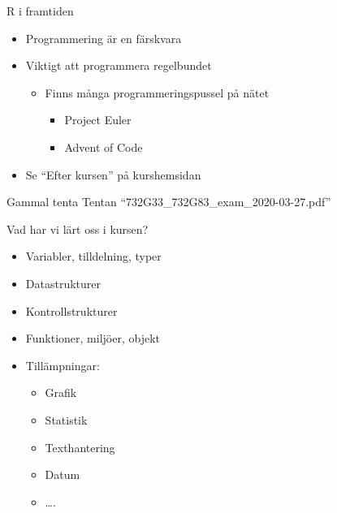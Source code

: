 \documentclass[
  11pt,
  ignorenonframetext,
  handout]{beamer}
\providecommand{\tightlist}{%
  \setlength{\itemsep}{0pt}\setlength{\parskip}{0pt}}
\begin{document}
\begin{frame}{R i framtiden}
\protect\hypertarget{r-i-framtiden}{}
\begin{itemize}
\tightlist
\item
  Programmering är en färskvara
\item
  Viktigt att programmera regelbundet

  \begin{itemize}
  \tightlist
  \item
    Finns många programmeringspussel på nätet

    \begin{itemize}
    \tightlist
    \item
      Project Euler
    \item
      Advent of Code
    \end{itemize}
  \end{itemize}
\item
  Se ``Efter kursen'' på kurshemsidan
\end{itemize}
\end{frame}

\begin{frame}{Gammal tenta}
\protect\hypertarget{gammal-tenta}{}
Tentan ``732G33\_732G83\_exam\_2020-03-27.pdf''

Vad har vi lärt oss i kursen?

\begin{itemize}
\tightlist
\item
  Variabler, tilldelning, typer
\item
  Datastrukturer
\item
  Kontrollstrukturer
\item
  Funktioner, miljöer, objekt
\item
  Tillämpningar:

  \begin{itemize}
  \tightlist
  \item
    Grafik
  \item
    Statistik
  \item
    Texthantering
  \item
    Datum
  \item
    \ldots.
  \end{itemize}
\end{itemize}
\end{frame}
\end{document}
